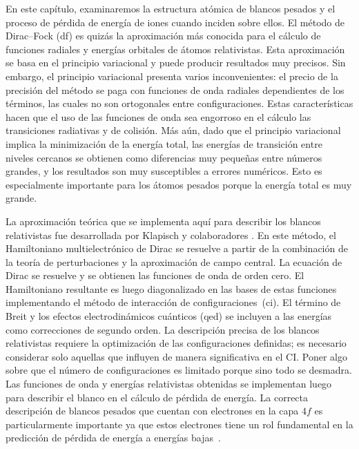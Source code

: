 En este capítulo, examinaremos la estructura atómica de blancos pesados
y el proceso de pérdida de energía de iones cuando inciden sobre ellos.
El método de Dirac--Fock (\acs{df}) es quizás la aproximación más 
conocida para el cálculo de funciones radiales y energías orbitales de 
átomos relativistas. Esta aproximación se basa en el principio 
variacional y puede producir resultados muy precisos. Sin embargo, el 
principio variacional presenta varios inconvenientes: el precio de la 
precisión del método se paga con funciones de onda radiales dependientes 
de los términos, las cuales no son ortogonales entre configuraciones. 
Estas características hacen que el uso de las funciones de onda sea 
engorroso en el cálculo las transiciones radiativas y de colisión. Más 
aún, dado que el principio variacional implica la minimización de la 
energía total, las energías de transición entre niveles cercanos se 
obtienen como diferencias muy pequeñas entre números grandes, y los 
resultados son muy susceptibles a errores numéricos. Esto es 
especialmente importante para los átomos pesados porque la energía total 
es muy grande. 

La aproximación teórica que se implementa aquí para describir los 
blancos relativistas fue desarrollada por Klapisch y colaboradores 
\cite{Klapisch:77,Koenig:72,Klapisch:71,Klapisch:67}. En este método, 
el Hamiltoniano multielectrónico de Dirac se resuelve a partir de la 
combinación de la teoría de perturbaciones y la aproximación de campo 
central. La ecuación de Dirac se resuelve y se obtienen las funciones 
de onda de orden cero. El Hamiltoniano resultante es luego diagonalizado 
en las bases de estas funciones implementando el método de interacción 
de configuraciones~(\acs{ci}). El término de Breit y los efectos 
electrodinámicos cuánticos (\acs{qed}) se incluyen a las energías como
correcciones de segundo orden. La descripción 
precisa de los blancos relativistas requiere la optimización de las 
configuraciones definidas; es necesario considerar solo aquellas que 
influyen de manera significativa en el CI. 
{\color{red} Poner algo sobre que el número de configuraciones es 
limitado porque sino todo se desmadra.} 
Las funciones de onda y energías relativistas obtenidas se implementan
luego para describir el blanco en el cálculo de pérdida de energía. La 
correcta descripción de blancos pesados que cuentan con electrones en la 
capa $4f$ es particularmente importante ya que estos electrones tiene un 
rol fundamental en la predicción de pérdida de energía a energías 
bajas~\cite{Roth:17}. 

